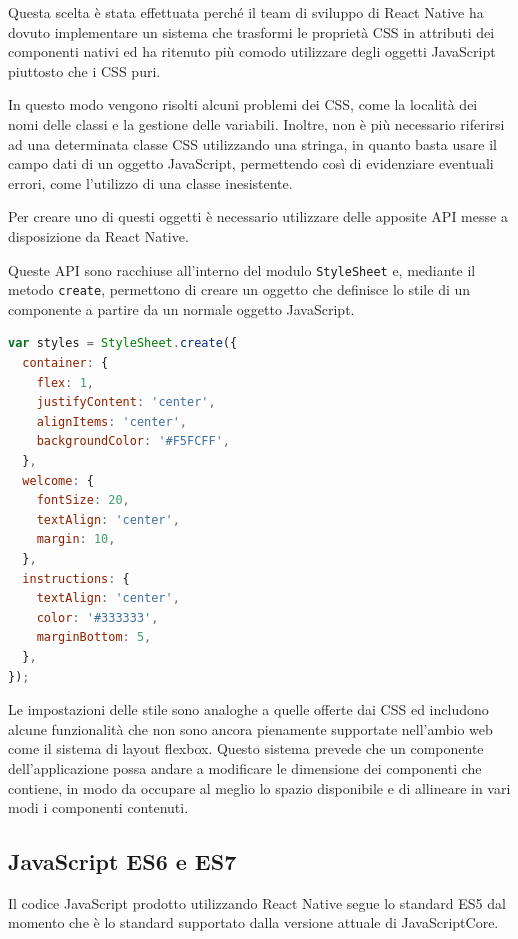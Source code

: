 Questa scelta è stata effettuata perché il team di sviluppo di React Native ha dovuto implementare un sistema che trasformi le proprietà CSS in attributi dei componenti nativi ed ha ritenuto più comodo utilizzare degli oggetti JavaScript piuttosto che i CSS puri.

In questo modo vengono risolti alcuni problemi dei CSS, come la località dei nomi delle classi e la gestione delle variabili.
Inoltre, non è più necessario riferirsi ad una determinata classe CSS utilizzando una stringa, in quanto basta usare il campo dati di un oggetto JavaScript, permettendo così di evidenziare eventuali errori, come l'utilizzo di una classe inesistente.

Per creare uno di questi oggetti è necessario utilizzare delle apposite API messe a disposizione da React Native.

Queste API sono racchiuse all'interno del modulo \texttt{StyleSheet} e, mediante il metodo \texttt{create}, permettono di creare un oggetto che definisce lo stile di un componente a partire da un normale oggetto JavaScript.

\begin{lstlisting}[language=JavaScript, caption=Esempio della definizione dello stile di un componente di React Native]
var styles = StyleSheet.create({
  container: {
    flex: 1,
    justifyContent: 'center',
    alignItems: 'center',
    backgroundColor: '#F5FCFF',
  },
  welcome: {
    fontSize: 20,
    textAlign: 'center',
    margin: 10,
  },
  instructions: {
    textAlign: 'center',
    color: '#333333',
    marginBottom: 5,
  },
});
\end{lstlisting}

Le impostazioni delle stile sono analoghe a quelle offerte dai CSS ed includono alcune funzionalità che non sono ancora pienamente supportate nell'ambio web come il sistema di layout flexbox.
Questo sistema prevede che un componente dell'applicazione possa andare a modificare le dimensione dei componenti che contiene, in modo da occupare al meglio lo spazio disponibile e di allineare in vari modi i componenti contenuti.

\subsection{JavaScript ES6 e ES7}

Il codice JavaScript prodotto utilizzando React Native segue lo standard ES5 dal momento che è lo standard supportato dalla versione attuale di JavaScriptCore.

